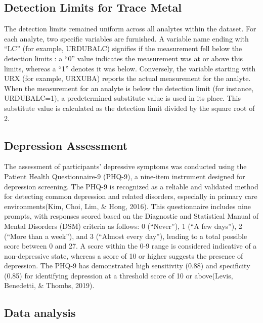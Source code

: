 \documentclass[
  man,floatsintext]{apa6}
\begin{document}
\hypertarget{detection-limits-for-trace-metal}{%
\subsection{Detection Limits for Trace Metal}\label{detection-limits-for-trace-metal}}

The detection limits remained uniform across all analytes within the dataset. For each analyte, two specific variables are furnished. A variable name ending with ``LC'' (for example, URDUBALC) signifies if the measurement fell below the detection limits : a ``0'' value indicates the measurement was at or above this limits, whereas a ``1'' denotes it was below. Conversely, the variable starting with URX (for example, URXUBA) reports the actual measurement for the analyte. When the measurement for an analyte is below the detection limit (for instance, URDUBALC=1), a predetermined substitute value is used in its place. This substitute value is calculated as the detection limit divided by the square root of 2.

\hypertarget{depression-assessment}{%
\subsection{Depression Assessment}\label{depression-assessment}}

The assessment of participants' depressive symptoms was conducted using the Patient Health Questionnaire-9 (PHQ-9), a nine-item instrument designed for depression screening. The PHQ-9 is recognized as a reliable and validated method for detecting common depression and related disorders, especially in primary care environments(Kim, Choi, Lim, \& Hong, 2016). This questionnaire includes nine prompts, with responses scored based on the Diagnostic and Statistical Manual of Mental Disorders (DSM) criteria as follows: 0 (``Never''), 1 (``A few days''), 2 (``More than a week''), and 3 (``Almost every day''), leading to a total possible score between 0 and 27. A score within the 0-9 range is considered indicative of a non-depressive state, whereas a score of 10 or higher suggests the presence of depression. The PHQ-9 has demonstrated high sensitivity (0.88) and specificity (0.85) for identifying depression at a threshold score of 10 or above(Levis, Benedetti, \& Thombs, 2019).

\hypertarget{data-analysis}{%
\subsection{Data analysis}\label{data-analysis}}
\end{document}
